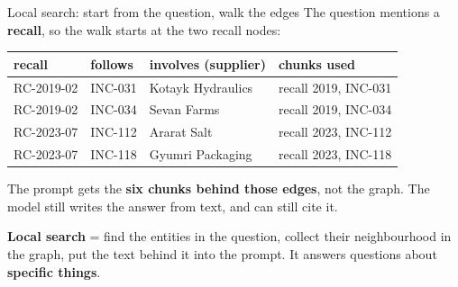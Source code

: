 \documentclass[aspectratio=169]{beamer}
\newcommand{\keybox}[1]{%
  \begin{tcolorbox}[colback=armblue!8, colframe=armblue, boxrule=0.6pt, arc=2pt]
  #1
  \end{tcolorbox}}
\begin{document}
\begin{frame}{Local search: start from the question, walk the edges}
  \vspace{0.1em}
  The question mentions a \textbf{recall}, so the walk starts at the two recall nodes:

  \vspace{0.3em}
  \begin{center}
  \small
  \begin{tabular}{llll}
    \toprule
    \textbf{recall} & \textbf{follows} & \textbf{involves (supplier)} & \textbf{chunks used} \\
    \midrule
    RC-2019-02 & INC-031 & Kotayk Hydraulics & recall 2019, INC-031 \\
    RC-2019-02 & INC-034 & Sevan Farms       & recall 2019, INC-034 \\
    RC-2023-07 & INC-112 & Ararat Salt       & recall 2023, INC-112 \\
    RC-2023-07 & INC-118 & Gyumri Packaging  & recall 2023, INC-118 \\
    \bottomrule
  \end{tabular}
  \end{center}

  \vspace{0.3em}
  The prompt gets the \textbf{six chunks behind those edges}, not the graph. The model still
  writes the answer from text, and can still cite it.

  \vspace{0.3em}
  \keybox{\small \textbf{Local search} = find the entities in the question, collect their
  neighbourhood in the graph, put the text behind it into the prompt. It answers questions
  about \textbf{specific things}.}
\end{frame}
\end{document}
